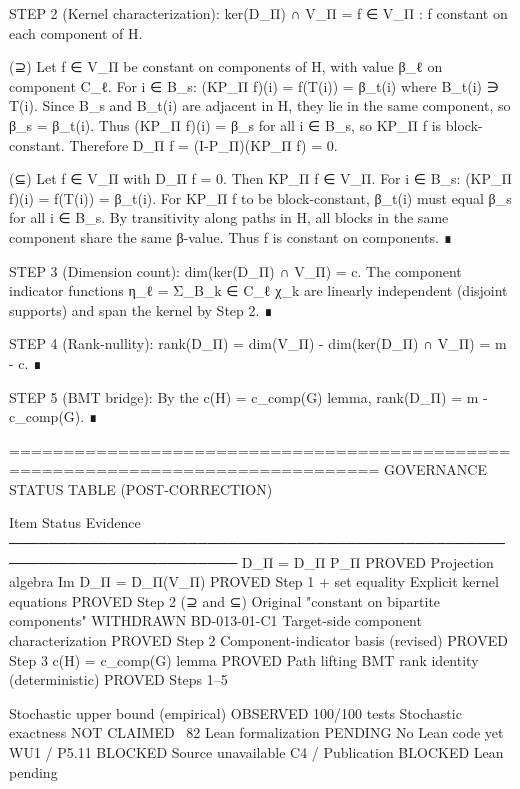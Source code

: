 STEP 2 (Kernel characterization): ker(D_Π) ∩ V_Π = {f ∈ V_Π : f constant on each component of H}.

(⊇) Let f ∈ V_Π be constant on components of H, with value β_ℓ on component C_ℓ.
For i ∈ B_s: (KP_Π f)(i) = f(T(i)) = β_{t(i)} where B_{t(i)} ∋ T(i).
Since B_s and B_{t(i)} are adjacent in H, they lie in the same component,
so β_s = β_{t(i)}. Thus (KP_Π f)(i) = β_s for all i ∈ B_s, so KP_Π f is
block-constant. Therefore D_Π f = (I-P_Π)(KP_Π f) = 0.

(⊆) Let f ∈ V_Π with D_Π f = 0. Then KP_Π f ∈ V_Π.
For i ∈ B_s: (KP_Π f)(i) = f(T(i)) = β_{t(i)}.
For KP_Π f to be block-constant, β_{t(i)} must equal β_s for all i ∈ B_s.
By transitivity along paths in H, all blocks in the same component share
the same β-value. Thus f is constant on components.
∎

STEP 3 (Dimension count): dim(ker(D_Π) ∩ V_Π) = c.
The component indicator functions η_ℓ = Σ_{B_k ∈ C_ℓ} χ_k are linearly
independent (disjoint supports) and span the kernel by Step 2. ∎

STEP 4 (Rank-nullity): rank(D_Π) = dim(V_Π) - dim(ker(D_Π) ∩ V_Π) = m - c. ∎

STEP 5 (BMT bridge): By the c(H) = c_comp(G) lemma, rank(D_Π) = m - c_comp(G). ∎

================================================================================
GOVERNANCE STATUS TABLE (POST-CORRECTION)

Item                                          Status        Evidence
─────────────────────────────────────────────────────────────────────────
D_Π = D_Π P_Π                                 PROVED        Projection algebra
Im D_Π = D_Π(V_Π)                             PROVED        Step 1 + set equality
Explicit kernel equations                     PROVED        Step 2 (⊇ and ⊆)
Original "constant on bipartite components"   WITHDRAWN     BD-013-01-C1
Target-side component characterization        PROVED        Step 2
Component-indicator basis (revised)           PROVED        Step 3
c(H) = c_comp(G) lemma                        PROVED        Path lifting
BMT rank identity (deterministic)             PROVED        Steps 1–5

Stochastic upper bound (empirical)            OBSERVED      100/100 tests
Stochastic exactness                          NOT CLAIMED   ~82%
Lean formalization                            PENDING       No Lean code yet
WU1 / P5.11                                   BLOCKED       Source unavailable
C4 / Publication                              BLOCKED       Lean pending

